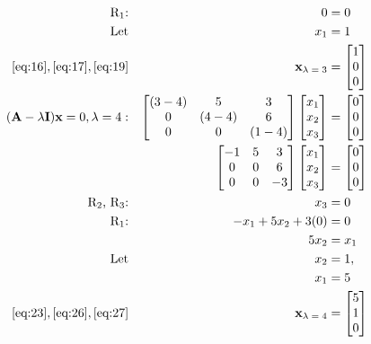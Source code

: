 \documentclass{article}
\begin{document}
\begin{align}
    \\
    \label{eq:18}
    \text{R\textsubscript{1}:} && 0 &= 0
    \\
    \label{eq:19}
    \text{Let} && x_1 &= 1
    \\
    \label{eq:20}
    \eqref{eq:16}, \eqref{eq:17}, \eqref{eq:19} && \textbf{x\textsubscript{$\lambda=3$}} &= \begin{bmatrix} 1\\0\\0 \end{bmatrix}
    \\
    \label{eq:21}
    (\textbf{A}-\lambda\textbf{I})\textbf{x} = 0, \lambda=4: && \begin{bmatrix} 
    (3-4) & 5 & 3\\
    0 & (4-4) & 6\\
    0 & 0 & (1-4) \end{bmatrix} \begin{bmatrix} x_1\\x_2\\x_3 \end{bmatrix} &= \begin{bmatrix} 0\\0\\0 \end{bmatrix}
    \\
    \label{eq:22}
    && \begin{bmatrix} 
    -1 & 5 & 3\\
    0 & 0 & 6\\
    0 & 0 & -3 \end{bmatrix} \begin{bmatrix} x_1\\x_2\\x_3 \end{bmatrix} &= \begin{bmatrix} 0\\0\\0 \end{bmatrix}
    \\
    \label{eq:23}
    \text{R\textsubscript{2}, R\textsubscript{3}:} && x_3 &= 0
    \\
    \label{eq:24}
    \text{R\textsubscript{1}:} && -x_1 +5x_2 + 3(0) &=0
    \\
    \label{eq:25}
    && 5x_2 &= x_1
    \\
    \label{eq:26}
    \text{Let} && x_2 &= 1,
    \\
    \label{eq:27} 
    && x_1 &= 5
    \\
    \label{eq:28}
    \eqref{eq:23}, \eqref{eq:26}, \eqref{eq:27} && \textbf{x\textsubscript{$\lambda=4$}} &= \begin{bmatrix} 5\\1\\0 \end{bmatrix}
\end{align}
\end{document}
